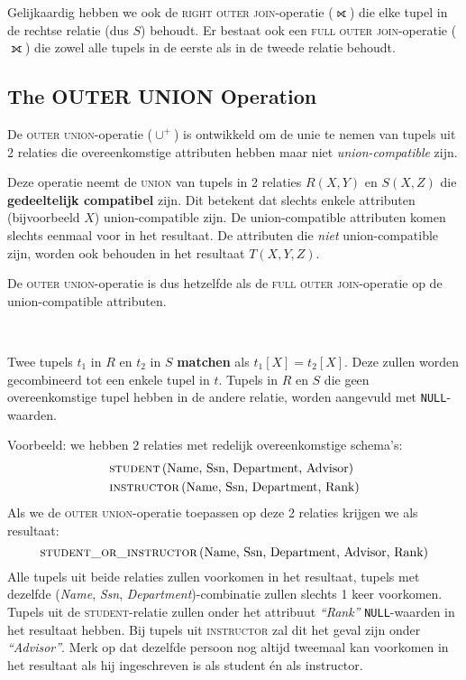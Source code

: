 Gelijkaardig hebben we ook de \textsc{right outer join}-operatie ($\rightouterjoin$) die elke tupel in de rechtse relatie (dus $S$) behoudt. Er bestaat ook een \textsc{full outer join}-operatie ($\fullouterjoin$) die zowel alle tupels in de eerste als in de tweede relatie behoudt.


\subsection{The OUTER UNION Operation}
De \textsc{outer union}-operatie ($\cup^+$) is ontwikkeld om de unie te nemen van tupels uit 2 relaties die overeenkomstige attributen hebben maar niet \textit{union-compatible} zijn.

Deze operatie neemt de \textsc{union} van tupels in 2 relaties $R(X,Y)$ en $S(X,Z)$ die \textbf{gedeeltelijk compatibel} zijn. Dit betekent dat slechts enkele attributen (bijvoorbeeld $X$) union-compatible zijn. De union-compatible attributen komen slechts eenmaal voor in het resultaat. De  attributen die \textit{niet} union-compatible zijn, worden ook behouden in het resultaat $T(X,Y,Z)$.

De \textsc{outer union}-operatie is dus hetzelfde als de \textsc{full outer join}-operatie op de union-compatible attributen.

~

\noindent Twee tupels $t_1$ in $R$ en $t_2$ in $S$ \textbf{matchen} als $t_1[X]=t_2[X]$. Deze zullen worden gecombineerd tot een enkele tupel in $t$. Tupels in $R$ en $S$ die geen overeenkomstige tupel hebben in de andere relatie, worden aangevuld met \texttt{NULL}-waarden.

\newpage
\noindent Voorbeeld: we hebben 2 relaties met redelijk overeenkomstige schema's:
\vspace{-2mm}
\begin{align*}
& \textsc{student} \,(\text{Name, Ssn, Department, Advisor}) \\
& \textsc{instructor} \,(\text{Name, Ssn, Department, Rank})
\end{align*}
Als we de \textsc{outer union}-operatie toepassen op deze 2 relaties krijgen we als resultaat:
\vspace{-2mm}
\[ \textsc{student\_or\_instructor} \,(\text{Name, Ssn, Department, Advisor, Rank}) \]
Alle tupels uit beide relaties zullen voorkomen in het resultaat, tupels met dezelfde (\textit{Name}, \textit{Ssn}, \textit{Department})-combinatie zullen slechts 1 keer voorkomen. Tupels uit de \textsc{student}-relatie zullen onder het attribuut \textit{``Rank''} \texttt{NULL}-waarden in het resultaat hebben. Bij tupels uit \textsc{instructor} zal dit het geval zijn onder \textit{``Advisor''}. Merk op dat dezelfde persoon nog altijd tweemaal kan voorkomen in het resultaat als hij ingeschreven is als student \'en als instructor.

